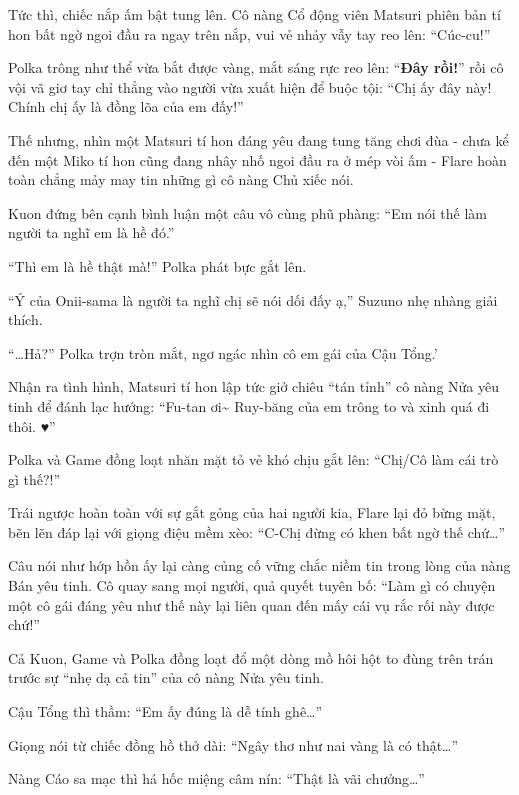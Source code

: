 \documentclass[../main.tex]{subfiles}
\begin{document}
Tức thì, chiếc nắp ấm bật tung lên. Cô nàng Cổ động viên Matsuri phiên bản tí hon bất ngờ ngoi đầu ra ngay trên nắp, vui vẻ nhảy vẫy tay reo lên: ``Cúc-cu!''


Polka trông như thể vừa bắt được vàng, mắt sáng rực reo lên: ``\textbf{Đây rồi!}'' rồi cô vội vã giơ tay chỉ thẳng vào người vừa xuất hiện để buộc tội: ``Chị ấy đây này! Chính chị ấy là đồng lõa của em đấy!''

Thế nhưng, nhìn một Matsuri tí hon đáng yêu đang tung tăng chơi đùa - chưa kể đến một Miko tí hon cũng đang nhây nhố ngoi đầu ra ở mép vòi ấm - Flare hoàn toàn chẳng mảy may tin những gì cô nàng Chủ xiếc nói.

Kuon đứng bên cạnh bình luận một câu vô cùng phũ phàng: ``Em nói thế làm người ta nghĩ em là hề đó.''

``Thì em là hề thật mà!'' Polka phát bực gắt lên.

``Ý của Onii-sama là người ta nghĩ chị sẽ nói dối đấy ạ,'' Suzuno nhẹ nhàng giải thích.

``\dots Hả?'' Polka trợn tròn mắt, ngơ ngác nhìn cô em gái của Cậu Tổng.'

Nhận ra tình hình, Matsuri tí hon lập tức giở chiêu ``tán tỉnh'' cô nàng Nửa yêu tinh để đánh lạc hướng: ``Fu-tan ơi\~{} Ruy-băng của em trông to và xinh quá đi thôi. ♥''

Polka và Game đồng loạt nhăn mặt tỏ vẻ khó chịu gắt lên: ``Chị/Cô làm cái trò gì thế?!''

Trái ngược hoàn toàn với sự gắt gỏng của hai người kia, Flare lại đỏ bừng mặt, bẽn lẽn đáp lại với giọng điệu mềm xèo: ``C-Chị đừng có khen bất ngờ thế chứ\dots''

Câu nói như hớp hồn ấy lại càng củng cố vững chắc niềm tin trong lòng của nàng Bán yêu tinh. Cô quay sang mọi người, quả quyết tuyên bố: ``Làm gì có chuyện một cô gái đáng yêu như thế này lại liên quan đến mấy cái vụ rắc rối này được chứ!''


Cả Kuon, Game và Polka đồng loạt đổ một dòng mồ hôi hột to đùng trên trán trước sự ``nhẹ dạ cả tin'' của cô nàng Nửa yêu tinh.

Cậu Tổng thì thầm: ``Em ấy đúng là dễ tính ghê\dots''

Giọng nói từ chiếc đồng hồ thở dài: ``Ngây thơ như nai vàng là có thật\dots''

Nàng Cáo sa mạc thì há hốc miệng câm nín: ``Thật là vãi chưởng\dots''
\end{document}
